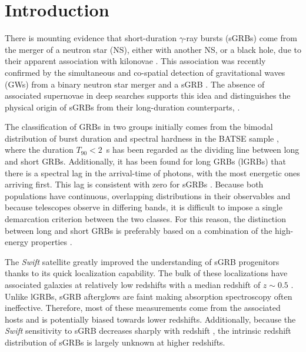 \documentclass{aa}    %
\begin{document}

\maketitle

\section{Introduction}

There is mounting evidence that short-duration $\gamma$-ray bursts (sGRBs) come
from the merger of a neutron star (NS), either with another NS, or a black hole,
due to their apparent association with kilonovae \citep{Barnes2013a,
	Tanvir2013b, Berger2013b, Yang2015, Jin2016, Rosswog2016}. This association was
recently confirmed by the simultaneous and co-spatial detection of gravitational
waves (GWs) from a binary neutron star merger and a sGRB
\citep{LIGOScientificCollaboration2017a, Goldstein2017, Savchenko2017}. The
absence of associated supernovae in deep searches
\citep[e.g.][]{Hjorth2005a,Fox2005,Hjorth2005b, Kann2011} supports this idea and
distinguishes the physical origin of sGRBs from their long-duration
counterparts, \citep[albeit see also][]{Fynbo2006b, Valle2006, Gal-Yam2006}.

The classification of GRBs in two groups initially comes from the bimodal
distribution of burst duration and spectral hardness in the BATSE sample \citep{Kouveliotou1993},
where the duration $T_{90} < 2$~s has been regarded as the dividing line between long
and short GRBs. Additionally, it has been found for long GRBs (lGRBs) that there is a
spectral lag in the arrival-time of photons, with the most energetic ones
arriving first. This lag is consistent with zero for sGRBs
\citep{Norris2006}. Because both populations have continuous, overlapping
distributions in their observables and because telescopes observe in differing
bands, it is difficult to impose a single demarcation criterion between the two
classes. For this reason, the distinction between long and short GRBs is
preferably based on a combination of the high-energy properties \citep{Zhang2009,
	Kann2011, Bromberg2012a, Bromberg2013}.

The \textit{Swift} satellite \citep{Gehrels2004} greatly improved the
understanding of sGRB progenitors thanks to its quick localization capability.
The bulk of these localizations have associated galaxies at relatively low
redshifts with a median redshift of $z\sim0.5$ \citep{Berger2014}. Unlike lGRBs,
sGRB afterglows are faint making absorption spectroscopy often ineffective.
Therefore, most of these measurements come from the associated hosts and is
potentially biased towards lower redshifts. Additionally, because the
\textit{Swift} sensitivity to sGRB decreases sharply with redshift
\citep{Behroozi2014}, the intrinsic redshift distribution of sGRBs is largely
unknown at higher redshifts.
\end{document}

